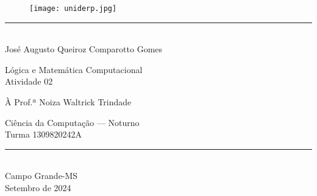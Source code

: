 \documentclass[12pt,letterpaper, onecolumn]{exam}
\author{\authorfullname}
\title{\subject: \assignment}
\newcommand{\subject}{Lógica e Matemática Computacional}
\newcommand{\assignment}{Atividade 02}
\newcommand{\authorfullname}{José Augusto Queiroz Comparotto Gomes}
\newcommand{\professor}{Prof.ª Noiza Waltrick Trindade}
\newcommand{\course}{Ciência da Computação — Noturno}
\newcommand{\classno}{1309820242A}
\newcommand{\location}{Campo Grande-MS}
\newcommand{\documentdate}{Setembro de 2024}
\begin{document}
\begingroup  

    \centering
    \begin{figure}
        \centering
        \texttt{[image: uniderp.jpg]}
        \label{fig:university-logo}
    \end{figure}
    
    \rule{\textwidth}{2pt}  \\[1em]
    
    \LARGE \authorfullname

    \vfill
    
    \LARGE \subject     \\
    \LARGE \assignment
    
    \vfill
    
    \large À \professor \\

    \vfill
    
    \large \course          \\
    \large Turma \classno   \\[1em]
    
    \rule{\textwidth}{2pt}  \\[1em]

    \large \location        \\
    \large \documentdate    \\

    \pagebreak
\endgroup

\pointsdroppedatright   %
\printanswers
\renewcommand{\solutiontitle}{\noindent\textbf{Resposta:}\enspace}  
\end{document}
